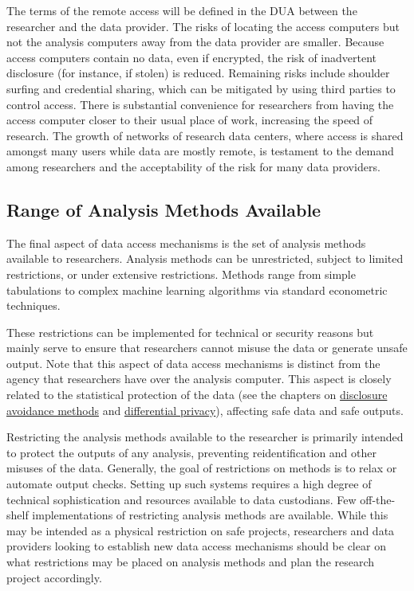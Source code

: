 The terms of the remote access will be defined in the DUA between the researcher and the data provider. The risks of locating the access computers but not the analysis computers away from the data provider are smaller. Because access computers contain no data, even if encrypted, the risk of inadvertent disclosure (for instance, if stolen) is reduced. Remaining risks include shoulder surfing and credential sharing, which can be mitigated by using third parties to control access. There is substantial convenience for researchers from having the access computer closer to their usual place of work, increasing the speed of research. The growth of networks of research data centers, where access is shared amongst many users while data are mostly remote, is testament to the demand among researchers and the acceptability of the risk for many data providers.

\hypertarget{range-of-analysis-methods-available}{%
\subsection{Range of Analysis Methods Available}\label{range-of-analysis-methods-available}}

The final aspect of data access mechanisms is the set of analysis methods available to researchers. Analysis methods can be unrestricted, subject to limited restrictions, or under extensive restrictions. Methods range from simple tabulations to complex machine learning algorithms via standard econometric techniques.

These restrictions can be implemented for technical or security reasons but mainly serve to ensure that researchers cannot misuse the data or generate unsafe output. Note that this aspect of data access mechanisms is distinct from the agency that researchers have over the analysis computer. This aspect is closely related to the statistical protection of the data (see the chapters on \protect\hyperlink{discavoid}{disclosure avoidance methods} and \protect\hyperlink{diffpriv}{differential privacy}), affecting safe data and safe outputs.

Restricting the analysis methods available to the researcher is primarily intended to protect the outputs of any analysis, preventing reidentification and other misuses of the data. Generally, the goal of restrictions on methods is to relax or automate output checks. Setting up such systems requires a high degree of technical sophistication and resources available to data custodians. Few off-the-shelf implementations of restricting analysis methods are available. While this may be intended as a physical restriction on safe projects, researchers and data providers looking to establish new data access mechanisms should be clear on what restrictions may be placed on analysis methods and plan the research project accordingly.

